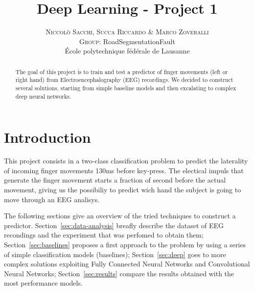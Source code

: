 \documentclass[10pt,conference,compsocconf]{IEEEtran}
\begin{document}
	
\pretitle{\begin{center}\Huge\bfseries} %
\posttitle{\end{center}} %
\title{Deep Learning - Project 1}

\author{
	\textsc{Niccol\`{o} Sacchi, Succa Riccardo \& Marco Zoveralli}
	\normalsize{} \\
	\textsc{Group:}
	\normalsize{RoadSegmentationFault}\\
	\normalsize \'{E}cole polytechnique f\'{e}d\'{e}rale de Lausanne
}

\maketitle

\begin{abstract}
  The goal of this project is to train and test a predictor of finger movements (left or right hand) from Electroencephalography
(EEG) recordings. We decided to construct several solutions, starting from simple baseline models and then excalating to complex deep neural networks. 
\end{abstract}

\section{Introduction}
This project consists in a two-class classification problem to predict the laterality of incoming finger movements 130ms before key-press. The electical impuls that generate the finger movement starts a fraction of second before the actual movement, giving us the possibiliy to predict wich hand the subject is going to move through an EEG analisys.


The following sections give an overview of the tried techniques to construct a predictor. Section~\ref{sec:data-analysis} breafly describe the dataset of EEG recondings and the experiment that was perfomed to obtain them; Section~\ref{sec:baselines} proposes a first approach to the problem by using a series of simple classification models (baselines); Section~\ref{sec:deep} goes to more complex solutions exploiting Fully Connected Neural Networks and Convolutional Neural Networks; Section~\ref{sec:results} compare the results obtained with the most performance models.
\end{document}

